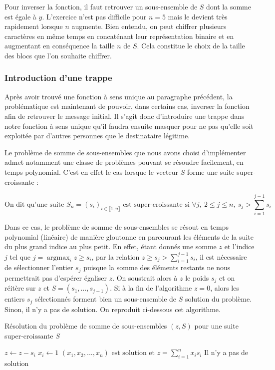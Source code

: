 \documentclass[a4paper,10pt]{article}
\newcommand{\argmax}{\mathop{\mathrm{argmax}}\nolimits}
\begin{document}
Pour inverser la fonction, il faut retrouver un sous-ensemble de $S$ dont la somme est égale à $y$. L'exercice n'est pas difficile pour $n=5$ mais le devient très rapidement lorsque $n$ augmente. Bien entendu, on peut chiffrer plusieurs caractères en même temps en concaténant leur représentation binaire et en augmentant en conséquence la taille $n$ de $S$. Cela constitue le choix de la taille des blocs que l'on souhaite chiffrer.

\subsubsection{Introduction d'une trappe}
\label{trappe}

Après avoir trouvé une fonction à sens unique au paragraphe précédent, la problématique est maintenant de pouvoir, dans certains cas, inverser la fonction afin de retrouver le message initial. Il s'agit donc d'introduire une trappe dans notre fonction à sens unique qu'il faudra ensuite masquer pour ne pas qu'elle soit exploitée par d'autres personnes que le destinataire légitime. 

Le problème de somme de sous-ensembles que nous avons choisi d'implémenter admet notamment une classe de problèmes pouvant se résoudre facilement, en temps polynomial. C'est en effet le cas lorsque le vecteur $S$ forme une suite super-croissante :

$$\text{On dit qu'une suite } S_n = (s_i)_{i\in \llbracket1, n\rrbracket}  \text{ est super-croissante si } \forall j,~2\leq j \leq n,~s_j > \sum \limits_{{i=1}}^{j-1} s_i$$

Dans ce cas, le problème de somme de sous-ensembles se résout en temps polynomial (linéaire) de manière gloutonne en parcourant les éléments de la suite du plus grand indice au plus petit. En effet, étant donnés une somme $z$ et l'indice $j$ tel que $j = \argmax_i z \ge s_i$, par la relation $z \ge s_j > \sum \limits_{{i=1}}^{j-1} s_i$, il est nécessaire de sélectionner l'entier $s_j$ puisque la somme des éléments restants ne nous permettrait pas d'espérer égaliser $z$. On soustrait alors à $z$ le poids $s_j$ et on réitère sur $z$ et $S = (s_1, …, s_{j-1})$. Si à la fin de l'algorithme $z = 0$, alors les entiers $s_j$ sélectionnés forment bien un sous-ensemble de $S$ solution du problème. Sinon, il n'y a pas de solution. On reproduit ci-dessous cet algorithme.

\begin{algorithm}
\caption{Résolution du problème de somme de sous-ensembles $(z, S)$ pour une suite super-croissante $S$}
\begin{algorithmic}[1]
\label{subset_algo}
		\State $z \leftarrow z-s_i$
		\State $x_i \leftarrow 1$
	\Else 
	\EndIf
\EndFor
{}
	\State $(x_1, x_2, ..., x_n) \text{ est solution et } z = \sum \limits_{{i=1}}^{n} x_i s_i$
\Else
	\State Il n'y a pas de solution
\EndIf
\end{algorithmic}
\end{algorithm}
\end{document}
